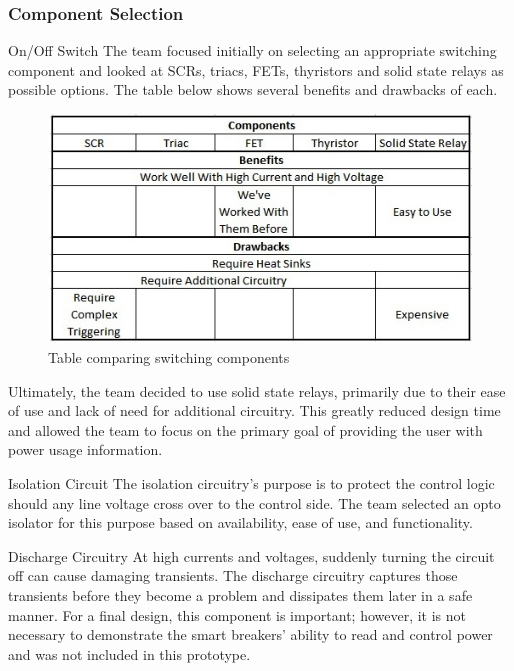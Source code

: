 \subsubsection{Component Selection}
On/Off Switch
The team focused initially on selecting an appropriate switching component and looked at SCRs, triacs, FETs, thyristors and solid state relays as possible options. The table below shows several benefits and drawbacks of each.

\begin{figure}[htbp]
\begin{center}
\includegraphics[width=5in]{includes/NJSwitchComponentOptions}
\caption{Table comparing switching components}
\label{fig:switch_component_options}  
\end{center}
\end{figure}

Ultimately, the team decided to use solid state relays, primarily due to their ease of use and lack of need for additional circuitry. This greatly reduced design time and allowed the team to focus on the primary goal of providing the user with power usage information. 

Isolation Circuit
The isolation circuitry's purpose is to protect the control logic should any line voltage cross over to the control side. The team selected an opto isolator for this purpose based on availability, ease of use, and functionality. 

Discharge Circuitry
At high currents and voltages, suddenly turning the circuit off can cause damaging transients. The discharge circuitry captures those transients before they become a problem and dissipates them later in a safe manner. For a final design, this component is important; however, it is not necessary to demonstrate the smart breakers' ability to read and control power and was not included in this prototype. 

